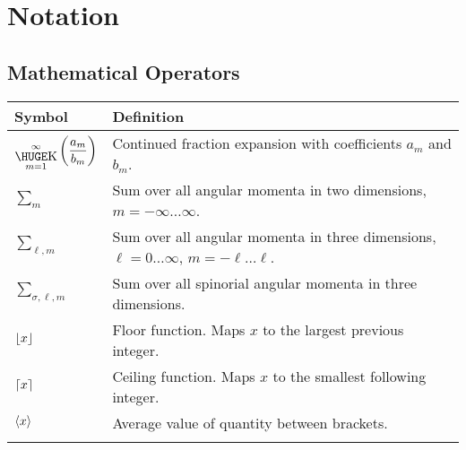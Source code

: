 \chapter*{Notation}


\section*{Mathematical Operators}
\begin{tabularx}{\textwidth}{lX}
  \hline\hline
  Symbol				& Definition	\\
  \hline\hline				
  $\displaystyle{\bigk_{m=1}^\infty\left(\frac{a_m}{b_m}\right)}$
						& Continued fraction expansion with coefficients $a_m$ and $b_m$. \\
  ${\sum_m}$			& Sum over all angular momenta in two dimensions, $m=-\infty\ldots\infty$.\\
  ${\sum_{\ell,m}}$		& Sum over all angular momenta in three dimensions, $\ell=0\ldots\infty$, $m=-\ell\ldots\ell$. \\
  ${\sum_{\sigma,\ell,m}}$	& Sum over all spinorial angular momenta in three dimensions.	\\
  $\floor*{x}$			& Floor function. Maps $x$ to the largest previous integer.	\\
  $\ceil*{x}$			& Ceiling function. Maps $x$ to the smallest following integer.	\\
  $\avg{x}$				& Average value of quantity between brackets.			\\
  \hline\hline				\\
\end{tabularx}

